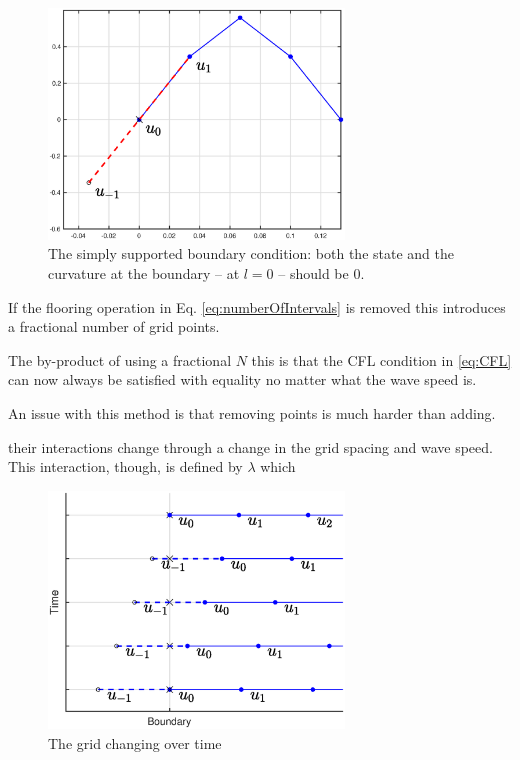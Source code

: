 \begin{figure}
    \centering
    \includegraphics[width=0.7\textwidth]{figures/contributions/dynamicgrid/simplySupportedBoundary.eps}
    \caption{\label{fig:simplySupportedBound}{The simply supported boundary condition: both the state and the curvature at the boundary -- at $l=0$ -- should be $0$.}}
\end{figure} 

If the flooring operation in Eq. \eqref{eq:numberOfIntervals} is removed this introduces a fractional number of grid points.


The by-product of using a fractional $N$ this is that the CFL condition in \eqref{eq:CFL} can now always be satisfied with equality no matter what the wave speed is.

An issue with this method is that removing points is much harder than adding.

their interactions change through a change in the grid spacing and wave speed. This interaction, though, is defined by $\lambda$ which 

\begin{figure}
    \centering
\includegraphics[width=0.7\textwidth]{figures/contributions/dynamicgrid/boundaryGrid.eps}
\caption{\label{fig:changingBoundary}{The grid changing over time}}
\end{figure}

